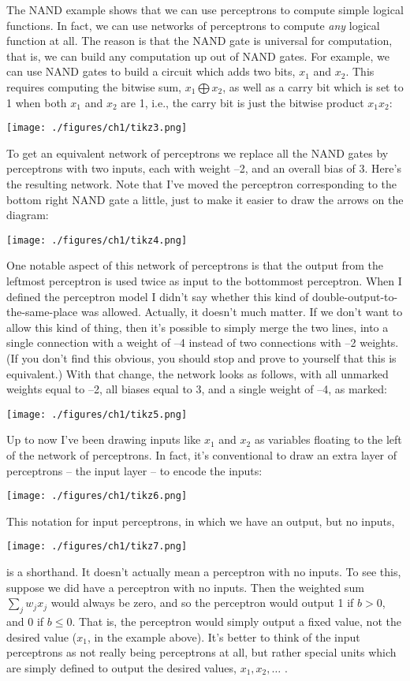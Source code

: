 \documentclass[a4paper,twoside,10pt]{book}
\begin{document}
The NAND example shows that we can use perceptrons to compute simple logical functions. In fact, we can use networks of perceptrons to compute \textit{any} logical function at all. The reason is that the NAND gate is universal for computation, that is, we can build any computation up out of NAND gates. For example, we can use NAND gates to build a circuit which adds two bits, $x_1$ and $x_2$. This requires computing the bitwise sum, $x_1\bigoplus x_2$, as well as a carry bit which is set to 1 when both $x_1$ and $x_2$ are 1, i.e., the carry bit is just the bitwise product $x_1x_2$:
\begin{center}
	\texttt{[image: ./figures/ch1/tikz3.png]}
\end{center}	
To get an equivalent network of perceptrons we replace all the NAND gates by perceptrons with two inputs, each with weight --2, and an overall bias of 3. Here's the resulting network. Note that I've moved the perceptron corresponding to the bottom right NAND gate a little, just to make it easier to draw the arrows on the diagram:
\begin{center}
	\texttt{[image: ./figures/ch1/tikz4.png]}
\end{center}	
One notable aspect of this network of perceptrons is that the output from the leftmost perceptron is used twice as input to the bottommost perceptron. When I defined the perceptron model I didn't say whether this kind of double-output-to-the-same-place was allowed. Actually, it doesn't much matter. If we don't want to allow this kind of thing, then it's possible to simply merge the two lines, into a single connection with a weight of --4 instead of two connections with --2 weights. (If you don't find this obvious, you should stop and prove to yourself that this is equivalent.) With that change, the network looks as follows, with all unmarked weights equal to --2, all biases equal to 3, and a single weight of --4, as marked:
\begin{center}
	\texttt{[image: ./figures/ch1/tikz5.png]}
\end{center}		
Up to now I've been drawing inputs like $x_1$ and $x_2$ as variables floating to the left of the network of perceptrons. In fact, it's conventional to draw an extra layer of perceptrons -- the input layer -- to encode the inputs:
\begin{center}
	\texttt{[image: ./figures/ch1/tikz6.png]}
\end{center}		
This notation for input perceptrons, in which we have an output, but no inputs,
\begin{center}
	\texttt{[image: ./figures/ch1/tikz7.png]}
\end{center}	
is a shorthand. It doesn't actually mean a perceptron with no inputs. To see this, suppose we did have a perceptron with no inputs. Then the weighted sum $\sum_jw_jx_j$ would always be zero, and so the perceptron would output 1 if $b>0$, and 0 if $b\le0$. That is, the perceptron would simply output a fixed value, not the desired value ($x_1$, in the example above). It's better to think of the input perceptrons as not really being perceptrons at all, but rather special units which are simply defined to output the desired values, $x_1,x_2,\ldots$ .
\end{document}
